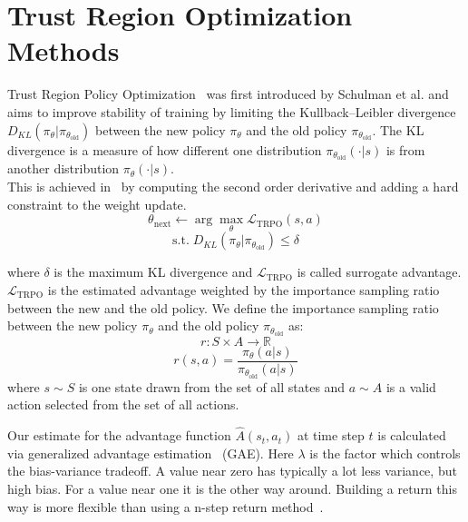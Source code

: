\documentclass{article}
\begin{document}
\section{Trust Region Optimization Methods}

Trust Region Policy Optimization~\cite{pmlr-v37-schulman15} was first introduced by Schulman et al.
and aims to improve stability of training by limiting the Kullback–Leibler divergence $D_{KL}(\pi_\theta|\pi_{\theta_{\text{old}}})$
between the new policy $\pi_\theta$ and the old policy $\pi_{\theta_{\text{old}}}$. The KL divergence is a measure of how different
one distribution $\pi_{\theta_{\text{old}}}(\cdot|s)$ is from another distribution $\pi_\theta(\cdot|s)$.\\

\noindent This is achieved in~\cite{pmlr-v37-schulman15} by computing the second order derivative and adding 
a hard constraint to the weight update. 
\begin{equation}
    \theta_{\text{next}} \xleftarrow{} \arg \max_{\theta} {\mathcal L}_{\text{TRPO}}(s, a) 
\end{equation}
\begin{equation*}
    \text{s.t.} \; {D}_{KL}(\pi_\theta|\pi_{\theta_{\text{old}}}) \leq \delta
\end{equation*}

\noindent where $\delta$ is the maximum KL divergence and ${\mathcal L}_{\text{TRPO}}$ is called surrogate 
advantage. ${\mathcal L}_{\text{TRPO}}$ is the estimated advantage weighted by the importance
sampling ratio between the new and the old policy. We define the importance sampling ratio between
the new policy $\pi_\theta$ and the old policy $\pi_{\theta_\text{old}}$ as:
\begin{equation}
    r : S \times A \xrightarrow{} \mathbb{R} 
\end{equation}
\begin{equation*}
    r(s, a) = \frac{\pi_{\theta}(a|s)}{\pi_{\theta_{\text{old}}}(a|s)}
\end{equation*}
where $s \sim S$ is one state drawn from the set of all states and $a \sim A$ is a
valid action selected from the set of all actions.

\noindent Our estimate for the advantage function $\hat A(s_t, a_t)$ at time step $t$ is
calculated via generalized advantage estimation~\cite{Schulmanetal_ICLR2016} (GAE). Here $\lambda$ is
the factor which controls the bias-variance tradeoff. A value near zero has typically a lot
less variance, but high bias. For a value near one it is the other way around.
Building a return this way is more flexible than using a n-step return method~\cite{DBLP:journals/corr/abs-2006-05990}.
\end{document}
